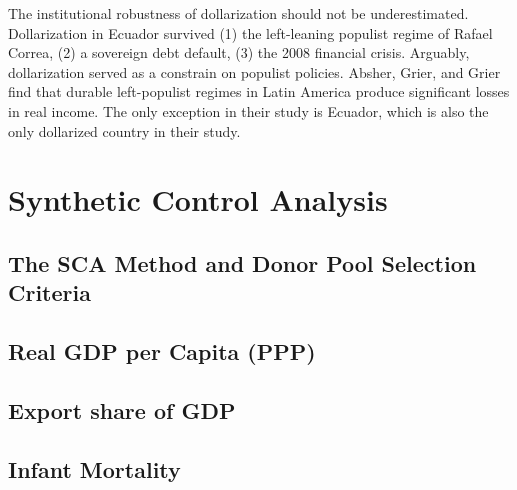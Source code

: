 \documentclass[12pt]{article}
\begin{document}
The institutional robustness of dollarization should not be underestimated. Dollarization in Ecuador survived (1) the left-leaning populist regime of Rafael Correa, (2) a sovereign debt default, (3) the 2008 financial crisis. Arguably, dollarization served as a constrain on populist policies. Absher, Grier, and Grier \parencite*{Absher2020} find that durable left-populist regimes in Latin America produce significant losses in real income. The only exception in their study is Ecuador, which is also the only dollarized country in their study.


\section{Synthetic Control Analysis}

\subsection{The SCA Method and Donor Pool Selection Criteria}

\subsection{Real GDP per Capita (PPP)}

\subsection{Export share of GDP}

\subsection{Infant Mortality}





\newpage
\singlespacing
\printbibliography


\end{document}
